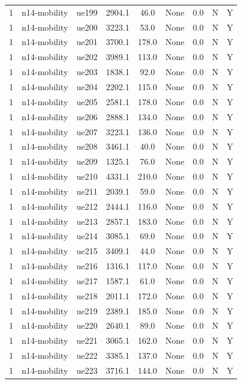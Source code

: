 \begin{table}[ht]
\begin{tabular}{|c|c|c|c|c|c|c|c|c|}
1 & n14-mobility & ue199 & 2904.1 & 46.0 & None & 0.0 & N & Y \\
1 & n14-mobility & ue200 & 3223.1 & 53.0 & None & 0.0 & N & Y \\
1 & n14-mobility & ue201 & 3700.1 & 178.0 & None & 0.0 & N & Y \\
1 & n14-mobility & ue202 & 3989.1 & 113.0 & None & 0.0 & N & Y \\
1 & n14-mobility & ue203 & 1838.1 & 92.0 & None & 0.0 & N & Y \\
1 & n14-mobility & ue204 & 2202.1 & 115.0 & None & 0.0 & N & Y \\
1 & n14-mobility & ue205 & 2581.1 & 178.0 & None & 0.0 & N & Y \\
1 & n14-mobility & ue206 & 2888.1 & 134.0 & None & 0.0 & N & Y \\
1 & n14-mobility & ue207 & 3223.1 & 136.0 & None & 0.0 & N & Y \\
1 & n14-mobility & ue208 & 3461.1 & 40.0 & None & 0.0 & N & Y \\
1 & n14-mobility & ue209 & 1325.1 & 76.0 & None & 0.0 & N & Y \\
1 & n14-mobility & ue210 & 4331.1 & 210.0 & None & 0.0 & N & Y \\
1 & n14-mobility & ue211 & 2039.1 & 59.0 & None & 0.0 & N & Y \\
1 & n14-mobility & ue212 & 2444.1 & 116.0 & None & 0.0 & N & Y \\
1 & n14-mobility & ue213 & 2857.1 & 183.0 & None & 0.0 & N & Y \\
1 & n14-mobility & ue214 & 3085.1 & 69.0 & None & 0.0 & N & Y \\
1 & n14-mobility & ue215 & 3409.1 & 44.0 & None & 0.0 & N & Y \\
1 & n14-mobility & ue216 & 1316.1 & 117.0 & None & 0.0 & N & Y \\
1 & n14-mobility & ue217 & 1587.1 & 61.0 & None & 0.0 & N & Y \\
1 & n14-mobility & ue218 & 2011.1 & 172.0 & None & 0.0 & N & Y \\
1 & n14-mobility & ue219 & 2389.1 & 185.0 & None & 0.0 & N & Y \\
1 & n14-mobility & ue220 & 2640.1 & 89.0 & None & 0.0 & N & Y \\
1 & n14-mobility & ue221 & 3065.1 & 162.0 & None & 0.0 & N & Y \\
1 & n14-mobility & ue222 & 3385.1 & 137.0 & None & 0.0 & N & Y \\
1 & n14-mobility & ue223 & 3716.1 & 144.0 & None & 0.0 & N & Y \\

\end{tabular}
\end{table}
